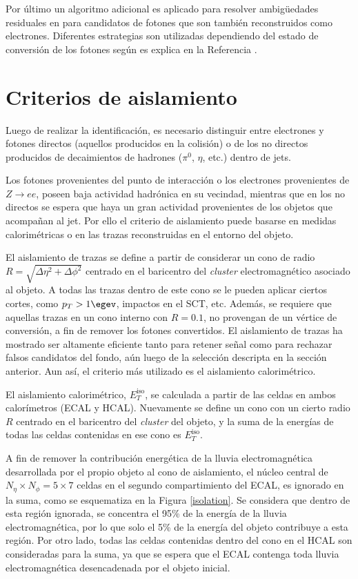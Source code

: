 Por último un algoritmo adicional es aplicado para resolver ambigüedades residuales en para candidatos de fotones que son también reconstruidos como electrones. Diferentes estrategias son utilizadas dependiendo del estado de conversión de los fotones según es explica en la Referencia \cite{ambiguity}.


\section{Criterios de aislamiento}

Luego de realizar la identificación, es necesario distinguir entre electrones y fotones directos (aquellos producidos en la colisión) o de los no directos producidos de decaimientos de hadrones ($\pi^{0}$, $\eta$, etc.) dentro de jets.

Los fotones provenientes del punto de interacción o los electrones provenientes de $Z\rightarrow ee$, poseen baja actividad hadrónica en su vecindad, mientras que en los no directos se espera que haya un gran actividad provenientes de los objetos que acompañan al jet. Por ello el criterio de aislamiento puede basarse en medidas calorimétricas o en las trazas reconstruidas en el entorno del objeto.

El aislamiento de trazas se define a partir de considerar un cono de radio $R=\sqrt{\Delta\eta^{2}+\Delta\phi^{2}}$ centrado en el baricentro del \textit{cluster} electromagnético asociado al objeto. A todas las trazas dentro de este cono se le pueden aplicar ciertos cortes, como $p_{T}>1 \egev$, impactos en el SCT, etc. Además, se requiere que aquellas trazas en un cono interno con $R=0.1$, no provengan de un vértice de conversión, a fin de remover los fotones convertidos. El aislamiento de trazas ha mostrado ser altamente eficiente tanto para retener señal como para rechazar falsos candidatos del fondo, aún luego de la selección descripta en la sección anterior. Aun así, el criterio más utilizado es el aislamiento calorimétrico.

El aislamiento calorimétrico, $E_{T}^{\text{iso}}$, se calculada a partir de las celdas en ambos calorímetros (ECAL y HCAL). Nuevamente se define un cono con un cierto radio $R$ centrado en el baricentro del \textit{cluster} del objeto, y la suma de la energías de todas las celdas contenidas en ese cono es $E_{T}^{\text{iso}}$. 

A fin de remover la contribución energética de la lluvia electromagnética desarrollada por el propio objeto al cono de aislamiento, el núcleo central de $N_{\eta}\times N_{\phi} = 5 \times 7$ celdas en el segundo compartimiento del ECAL, es ignorado en la suma, como se esquematiza en la Figura \ref{isolation}. Se considera que dentro de esta región ignorada, se concentra el 95\% de la energía de la lluvia electromagnética, por lo que solo el 5\% de la energía del objeto contribuye a esta región. Por otro lado, todas las celdas contenidas dentro del cono en el HCAL son consideradas para la suma, ya que se espera que el ECAL contenga toda lluvia electromagnética desencadenada por el objeto inicial. 

